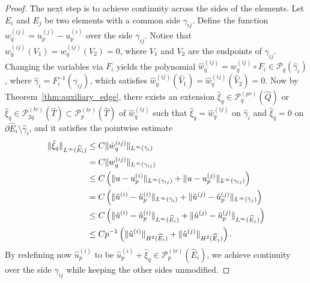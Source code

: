 \documentclass[english, 12pt, a4paper, sci, utf8, a-2b, online]{aaltothesis}
\theoremstyle{definition}
\theoremstyle{plain}
\DeclarePairedDelimiter\norm{\lVert}{\rVert}
\numberwithin{equation}{section}
\begin{document}
\begin{proof}
    The next step is to achieve continuity across the sides of the elements.
    Let $E_i$ and $E_j$ be two elements with a common side $\gamma_{ij}$.
    Define the function $w_q^{(ij)} = u_p^{(j)} - u_p^{(i)}$ over the side $\gamma_{ij}$.
    Notice that $w_q^{(ij)}(V_1) = w_q^{(ij)}(V_2) = 0$,
    where $V_1$ and $V_2$ are the endpoints of $\gamma_{ij}$.
    Changing the variables via $F_i$ yields the polynomial
    $\hat{w}_q^{(ij)} = w_q^{(ij)} \circ F_i \in \mathcal{P}_q(\hat{\gamma}_i)$,
    where $\hat{\gamma}_i = F_i^{-1}(\gamma_{ij})$, which satisfies
    $\hat{w}_q^{(ij)}(\widehat{V}_1) = \hat{w}_q^{(ij)}(\widehat{V}_2) = 0$.
    Now by Theorem~\ref{thm:auxiliary_edge}, there exists an extension
    $\hat{\xi}_q \in \mathcal{P}_q^{(pr)}(\widehat{Q})$ or
    $\hat{\xi}_q \in \mathcal{P}_{2q}^{(tr)}(\widehat{T}) \subset \mathcal{P}_p^{(tr)}(\widehat{T})$
    of $\hat{w}_q^{(ij)}$ such that $\hat{\xi}_q = \hat{w}_q^{(ij)}$ on $\hat{\gamma}_i$
    and $\hat{\xi}_q = 0$ on $\partial \widehat{E}_i \setminus \hat{\gamma}_i$, and
    it satisfies the pointwise estimate
    \begin{align}
        \norm{\hat{\xi}_q}_{L^{\infty}(\widehat{E}_i)}
        &\leq C \norm{\hat{w}_q^{(ij)}}_{L^{\infty}(\hat{\gamma}_i)} \nonumber \\
        &= C \norm{w_q^{(ij)}}_{L^{\infty}(\gamma_{ij})} \nonumber \\
        &\leq C \left( \norm{u - u_p^{(i)}}_{L^{\infty}(\gamma_{ij})}
                + \norm{u - u_p^{(j)}}_{L^{\infty}(\gamma_{ij})} \right) \nonumber \\
        &= C \left( \norm{\hat{u}^{(i)} - \hat{u}_p^{(i)}}_{L^{\infty}(\hat{\gamma}_i)}
                + \norm{\hat{u}^{(j)} - \hat{u}_p^{(j)}}_{L^{\infty}(\hat{\gamma}_j)} \right)
                \nonumber \\
        &\leq C \left( \norm{\hat{u}^{(i)} - \hat{u}_p^{(i)}}_{L^{\infty}(\widehat{E}_i)}
                + \norm{\hat{u}^{(j)} - \hat{u}_p^{(j)}}_{L^{\infty}(\widehat{E}_j)} \right)
                \nonumber \\
        \label{eq:approx_props_of_S_piecewise_side_update}
        &\leq C p^{-1} \left( \norm{\hat{u}^{(i)}}_{H^2(\widehat{E}_i)}
            + \norm{\hat{u}^{(j)}}_{H^2(\widehat{E}_j)} \right).
    \end{align}
    By redefining now $\hat{u}_p^{(i)}$ to be
    $\hat{u}_p^{(i)} + \hat{\xi}_q \in \mathcal{P}_p^{(tr)}(\widehat{E}_i)$,
    we achieve continuity over the side $\gamma_{ij}$ while keeping the other sides unmodified.

\end{proof}
\end{document}
